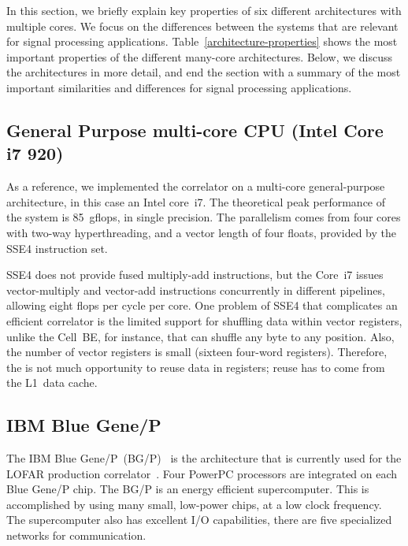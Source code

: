 \documentclass{article}
\begin{document}
In this section, we briefly explain key properties of six different
architectures with multiple cores.  We focus on the differences
between the systems that are relevant for signal processing
applications. Table~\ref{architecture-properties} shows the most
important properties of the different many-core architectures. Below,
we discuss the architectures in more detail, and end the section with
a summary of the most important similarities and differences for signal processing applications.


\subsection{General Purpose multi-core CPU (Intel Core i7 920)}

As a reference, we implemented the correlator on a multi-core
general-purpose architecture, in this case an Intel core~i7.  The theoretical peak performance of the
system is 85~gflops, in single precision.  The parallelism comes from
four cores with two-way hyperthreading, and a vector length of four
floats, provided by the SSE4 instruction set.

SSE4 does not provide fused multiply-add instructions, but the Core~i7
issues vector-multiply and vector-add instructions concurrently in
different pipelines, allowing eight flops per cycle per core.  One
problem of SSE4 that complicates an efficient correlator is the
limited support for shuffling data within vector registers, unlike the
Cell~BE, for instance, that can shuffle any byte to any position.
Also, the number of vector registers is small (sixteen four-word
registers).  Therefore, the is not much opportunity to reuse data in
registers; reuse has to come from the L1~data cache. 

\subsection{IBM Blue Gene/P}

The IBM Blue Gene/P~(BG/P)~\cite{IBM:08} is the architecture that is
currently used for the LOFAR production correlator~\cite{Romein:09b}.
Four PowerPC processors are integrated on each Blue Gene/P chip.
The BG/P is an energy efficient supercomputer.
This is accomplished by using many small, low-power chips, at a low clock
frequency.
The supercomputer also has excellent I/O capabilities, there are five
specialized networks for communication.
\end{document}
